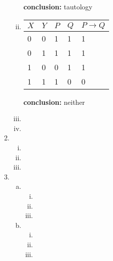 \documentclass{article}
\begin{document}
\begin{enumerate}
\begin{enumerate}[(i)]
\begin{tabular}{|l|l|l|l|l|l|}
           \end{tabular}
          \textbf{conclusion:} tautology
    \item %
          \begin{tabular}{|l|l|l|l|l|}
            \hline
            $X$ & $Y$ & $P$ & $Q$ & $P\to Q$\\ \hline
            0&0&1&1&1\\
            0&1&1&1&1\\
            1&0&0&1&1\\
            1&1&1&0&0\\\hline
          \end{tabular}
          \textbf{conclusion:} neither
    \item %

    \item %

  \end{enumerate}

  \item
  \begin{enumerate}[(i)]
    \item %

    \item %

    \item %

  \end{enumerate}

  \item
  \begin{enumerate}[(a)]
    \item %
    \begin{enumerate}[(i)]
      \item %

      \item %

      \item %

    \end{enumerate}

    \item %
    \begin{enumerate}[(i)]
      \item %

      \item %

      \item %


\end{enumerate}
\end{enumerate}
\end{enumerate}
\end{document}
